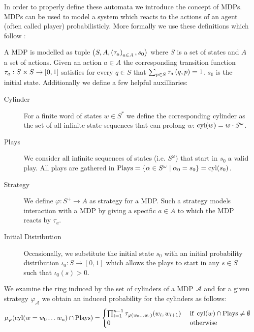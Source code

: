 In order to properly define these automata we introduce the concept of
\aclp{MDP}. \aclp*{MDP} can be used to model a system which reacts to the
actions of an agent (often called player) probabilisticly. More formally we use these definitions which follow
\cite{RandAutoInfTrees}:
\begin{definition}
  A \acl*{MDP} is modelled as tuple
  $\left(S, A, \left(\tau_{a}\right)_{a\in A}, s_{0}\right)$ where $S$ is a set of states
  and $A$ a set of actions. Given an action $a\in A$ the corresponding
  transition function $\tau_{a}:S\times S\rightarrow \left[0,1\right]$ satisfies
  for every $q\in S$ that $\sum_{p\in S}\tau_{a}\left(q,p\right) = 1$.
  $s_{0}$ is the initial state. Additionally we define a few helpful
  auxilliaries:
  \begin{description}
    \item [Cylinder] For a finite word of states $w\in S^{*}$ we define the
      corresponding cylinder as the set of all infinite state-sequences
      that can prolong $w$: $\operatorname{cyl}(w) = w\cdot S^{\omega}$.
    \item [Plays] We consider all infinite sequences of states
      (i.e. $S^{\omega}$) that start in $s_{0}$ a valid play. All plays
      are gathered in $\operatorname{Plays} = \left\{
        \alpha\in S^{\omega}\mid \alpha_{0} = s_{0}\right\} = \operatorname{cyl}(s_{0})$.
    \item [Strategy] We define $\varphi:S^{+}\rightarrow A$ as strategy for
      a \ac{MDP}. Such a strategy models interaction with a \ac{MDP} by
      giving a specific $a\in A$ to which the \ac{MDP} reacts by $\tau_{a}$.
    \item [Initial Distribution] Occasionally, we substitute the initial state
      $s_{0}$ with an initial probability distribution
      $\iota_{0}:S\rightarrow[0,1]$ which allows the plays to start in any
      $s\in S$ such that $\iota_{0}(s) > 0$.
  \end{description}
  \label{def:mdp}
\end{definition}
We examine the ring induced by the set of cylinders of a \ac{MDP} $\mathcal{A}$
and for a given strategy $\varphi_{\mathcal{A}}$ we obtain an induced
probability for the cylinders as follows:
\begin{equation}
  \mu_{\varphi}(\operatorname{cyl}(w = w_{0}\dots w_{n})\cap\operatorname{Plays}) = \begin{cases}
    \prod_{i=1}^{n-1}\tau_{\varphi(w_{0}\dots w_{i})}(w_{i}, w_{i+1})
      &\text{ if }\operatorname{cyl}(w)\cap\operatorname{Plays}\neq\emptyset\\
    0 &\text{ otherwise}
  \end{cases}
\end{equation}
